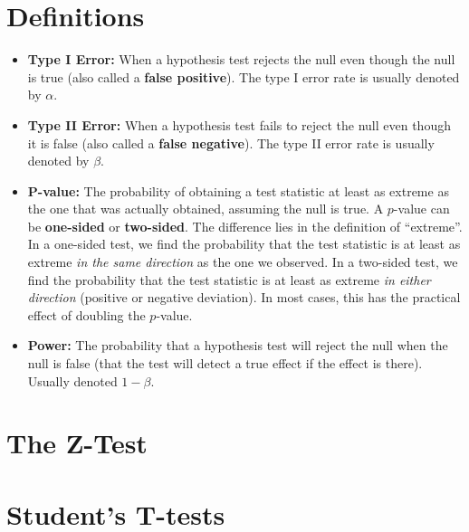 
\section{Definitions}

\begin{itemize}
\item \textbf{Type I Error:} When a hypothesis test rejects the null even though the null is true (also called a \textbf{false positive}). The type I error rate is usually denoted by $\alpha$.
\item \textbf{Type II Error:} When a hypothesis test fails to reject the null even though it is false (also called a \textbf{false negative}). The type II error rate is usually denoted by $\beta$.
\item \textbf{P-value:} The probability of obtaining a test statistic at least as extreme as the one that was actually obtained, assuming the null is true. A $p$-value can be \textbf{one-sided} or \textbf{two-sided}. The difference lies in the definition of ``extreme''. In a one-sided test, we find the probability that the test statistic is at least as extreme \emph{in the same direction} as the one we observed. In a two-sided test, we find the probability that the test statistic is at least as extreme \emph{in either direction} (positive or negative deviation). In most cases, this has the practical effect of doubling the $p$-value.
\item \textbf{Power:} The probability that a hypothesis test will reject the null when the null is false (that the test will detect a true effect if the effect is there). Usually denoted $1 - \beta$.
\end{itemize}


\section{The Z-Test}




\section{Student's T-tests}

